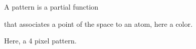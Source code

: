 \documentclass[preview]{standalone}
\begin{document}
\begin{center}
A pattern is a partial function

that associates a point of the space to an atom, here a color.

Here, a 4 pixel pattern.
\end{center}
\end{document}
